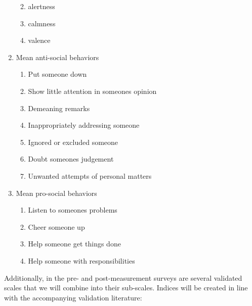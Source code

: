 \documentclass[]{article}
\providecommand{\tightlist}{%
\setlength{\itemsep}{0pt}\setlength{\parskip}{0pt}}
\begin{document}
\begin{enumerate}
  \begin{enumerate}
  \def\labelenumii{\alph{enumii}.}
  \tightlist
  \item
    alertness
  \item
    calmness
  \item
    valence
  \end{enumerate}
\item
  Mean anti-social behaviors

  \begin{enumerate}
  \def\labelenumii{\alph{enumii}.}
  \tightlist
  \item
    Put someone down
  \item
    Show little attention in someones opinion
  \item
    Demeaning remarks
  \item
    Inappropriately addressing someone
  \item
    Ignored or excluded someone
  \item
    Doubt someones judgement
  \item
    Unwanted attempts of personal matters
  \end{enumerate}
\item
  Mean pro-social behaviors

  \begin{enumerate}
  \def\labelenumii{\alph{enumii}.}
  \tightlist
  \item
    Listen to someones problems
  \item
    Cheer someone up
  \item
    Help someone get things done
  \item
    Help someone with responsibilities
  \end{enumerate}
\end{enumerate}

Additionally, in the pre- and post-measurement surveys are several
validated scales that we will combine into their sub-scales. Indices
will be created in line with the accompanying validation literature:


\end{document}
